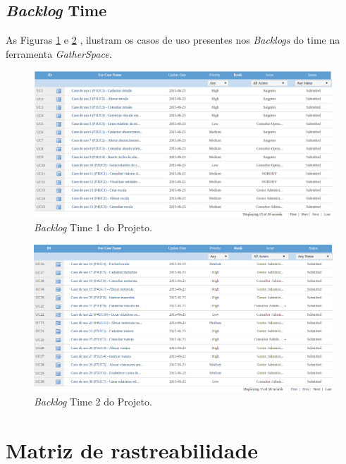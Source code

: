     \subsection{\textit{Backlog} Time}
    
   As Figuras \ref{fig:backlog_time_1} e \ref{fig:backlog_time_2} , ilustram os casos de uso presentes nos \textit{Backlogs} do time na ferramenta \textit{GatherSpace}.
    
       \begin{figure}[!htbp]
	\centering
	\includegraphics[scale=0.5, angle = 0]{figuras/backlog_time_1}
	\caption[\textit{Backlog} Time 1 do Projeto]
	    {\textit{Backlog} Time 1 do Projeto.}
	\label{fig:backlog_time_1}
      \end{figure}
      
       \begin{figure}[!htbp]
	\centering
	\includegraphics[scale=0.5, angle = 0]{figuras/backlog_time_2}
	\caption[\textit{Backlog} Time 2 do Projeto]
	    {\textit{Backlog} Time 2 do Projeto.}
	\label{fig:backlog_time_2}
      \end{figure}
     
  
  \section{Matriz de rastreabilidade}
  
